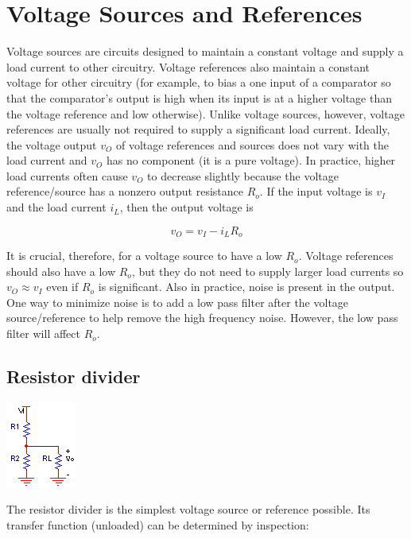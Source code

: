 \chapter{Voltage Sources and References}
Voltage sources are circuits designed to maintain a constant voltage and supply a load current to other circuitry.
Voltage references also maintain a constant voltage for other circuitry (for example, to bias a one input of a comparator so that the comparator's output is high when its input is at a higher voltage than the voltage reference and low otherwise).
Unlike voltage sources, however, voltage references are usually not required to supply a significant load current.
Ideally, the voltage output $v_{O}$ of voltage references and sources does not vary with the load current and $v_{O}$ has no \AC component (it is a pure \DC voltage).
In practice, higher load currents often cause $v_{O}$ to decrease slightly because the voltage reference/source has a nonzero output resistance $R_{o}$.
If the input voltage is $v_{I}$ and the load current $i_{L}$, then the output voltage is

\begin{equation}
v_{O} = v_{I} - i_{L}R_{o}
\end{equation}

It is crucial, therefore, for a voltage source to have a low $R_{o}$.
Voltage references should also have a low $R_{o}$, but they do not need to supply larger load currents so $v_{O} \approx v_{I}$ even if $R_{o}$ is significant.
Also in practice, \AC noise is present in the output.
One way to minimize \AC noise is to add a low pass filter after the voltage source/reference to help remove the high frequency noise.
However, the low pass filter will affect $R_{o}$.
\section{Resistor divider}
\begin{center}
	\includegraphics{schematics/resistordivider.PNG}
\end{center}
The resistor divider is the simplest voltage source or reference possible. Its transfer function (unloaded) can be determined by inspection:

